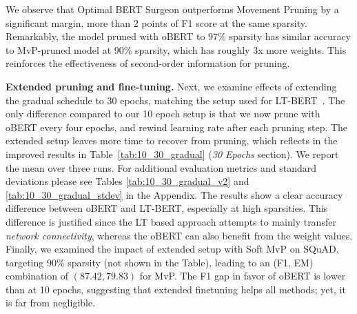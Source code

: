 \documentclass[11pt]{article}
\begin{document}
We observe that Optimal BERT Surgeon outperforms Movement Pruning by a significant margin, more than 2 points of F1 score at the same sparsity. Remarkably, the model pruned with oBERT to 97\% sparsity has similar accuracy to MvP-pruned model at 90\% sparsity, which has roughly 3x more weights. This reinforces the effectiveness of second-order information for pruning.

\noindent\textbf{Extended pruning and fine-tuning.} 
Next, we examine effects of extending the gradual schedule to 30 epochs, matching the setup used for LT-BERT~\cite{chen2020lottery}. The only difference compared to our 10 epoch setup is that we now prune with oBERT every four epochs, and rewind learning rate after each pruning step. The extended setup leaves more time to recover from pruning, which reflects in the improved results in Table~\ref{tab:10_30_gradual} (\textit{30 Epochs} section). We report the mean over three runs. For additional evaluation metrics and standard deviations please see Tables \ref{tab:10_30_gradual_v2} and \ref{tab:10_30_gradual_stdev} in the Appendix. The results show a clear accuracy difference between oBERT and LT-BERT, especially at high sparsities. This difference is justified since the LT based approach attempts to mainly transfer \emph{network connectivity}, whereas the oBERT can also benefit from the weight values. Finally, we examined the impact of extended setup with Soft MvP on SQuAD, targeting 90\% sparsity (not shown in the Table), leading to an (F1, EM) combination of $(87.42, 79.83)$ for MvP. The F1 gap in favor of oBERT is lower than at 10 epochs, suggesting that extended finetuning helps all methods; yet, it is far from negligible.
\end{document}
